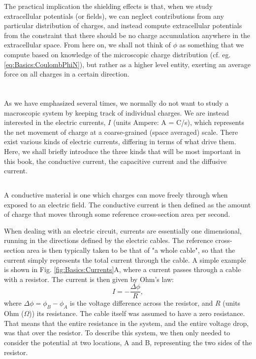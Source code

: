 The practical implication the shielding effects is that, when we study extracellular potentials (or fields), we can neglect contributions from any particular distribution of charges, and instead compute extracellular potentials from the constraint that there should be no charge accumulation anywhere in the extracellular space. From here on, we shall not think of $\phi$ as something that we compute based on knowledge of the microscopic charge distribution (cf. eg. \ref{eq:Basics:CoulombPhiN}), but rather as a higher level entity, exerting an average force on all charges in a certain direction.





\section{}
\label{sec:Basics:Current} 
As we have emphasized several times, we normally do not want to study a macroscopic system by keeping track of individual charges. We are instead interested in the electric currents, $I$ (units Ampere: A = C/s), which represents the net movement of charge at a coarse-grained (space averaged) scale. There exist various kinds of electric currents, differing in terms of what drive them. Here, we shall briefly introduce the three kinds that will be most important in this book, the conductive current, the capacitive current and the diffusive current.


\subsection{}
\label{sec:Basics:ConductiveCurrent} 
A conductive material   is one which charges can move freely through when exposed to an electric field. The conductive current is then defined as the amount of charge that moves through some reference cross-section area per second. 

When dealing with an electric circuit, currents are essentially one dimensional, running in the directions defined by the electric cables. The reference cross-section area is then typically taken to be that of "a whole cable", so that the current simply represents the total current through the cable. A simple example is shown in Fig. \ref{fig:Basics:Currents}A, where a current passes through a cable with a resistor. The current is then given by Ohm's law:
\begin{equation}
I = - \frac{\Delta \phi}{R}, 
\label{eq:Basics:Ohm_R}
\end{equation}
where $\Delta \phi = \phi_B-\phi_A$ is the voltage difference across the resistor, and $R$ (units Ohm ($\Omega$)) its resistance. The cable itself was assumed to have a zero resistance. That means that the entire resistance in the system, and the entire voltage drop, was that over the resistor. To describe this system, we then only needed to consider the potential at two locations, A and B, representing the two sides of the resistor. 

